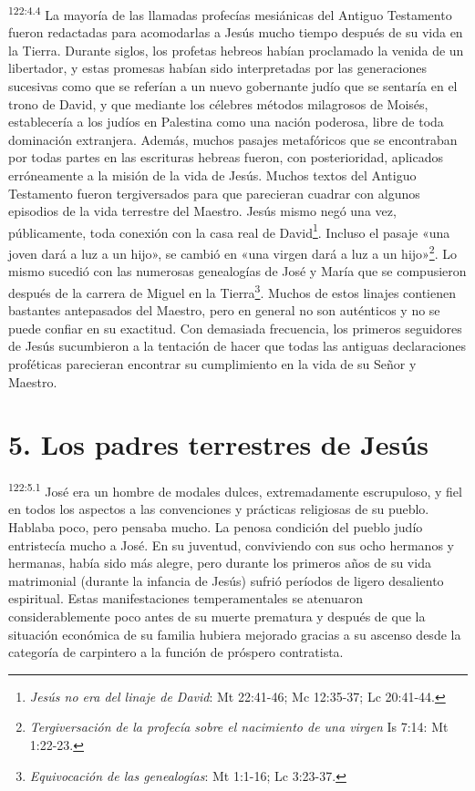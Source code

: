 \par
\textsuperscript{122:4.4} La mayoría de las llamadas profecías mesiánicas del Antiguo Testamento fueron redactadas para acomodarlas a Jesús mucho tiempo después de su vida en la Tierra. Durante siglos, los profetas hebreos habían proclamado la venida de un libertador, y estas promesas habían sido interpretadas por las generaciones sucesivas como que se referían a un nuevo gobernante judío que se sentaría en el trono de David, y que mediante los célebres métodos milagrosos de Moisés, establecería a los judíos en Palestina como una nación poderosa, libre de toda dominación extranjera. Además, muchos pasajes metafóricos que se encontraban por todas partes en las escrituras hebreas fueron, con posterioridad, aplicados erróneamente a la misión de la vida de Jesús. Muchos textos del Antiguo Testamento fueron tergiversados para que parecieran cuadrar con algunos episodios de la vida terrestre del Maestro. Jesús mismo negó una vez, públicamente, toda conexión con la casa real de David\footnote{\textit{Jesús no era del linaje de David}: Mt 22:41-46; Mc 12:35-37; Lc 20:41-44.}. Incluso el pasaje «una joven dará a luz a un hijo», se cambió en «una virgen dará a luz a un hijo»\footnote{\textit{Tergiversación de la profecía sobre el nacimiento de una virgen} Is 7:14: Mt 1:22-23.}. Lo mismo sucedió con las numerosas genealogías de José y María que se compusieron después de la carrera de Miguel en la Tierra\footnote{\textit{Equivocación de las genealogías}: Mt 1:1-16; Lc 3:23-37.}. Muchos de estos linajes contienen bastantes antepasados del Maestro, pero en general no son auténticos y no se puede confiar en su exactitud. Con demasiada frecuencia, los primeros seguidores de Jesús sucumbieron a la tentación de hacer que todas las antiguas declaraciones proféticas parecieran encontrar su cumplimiento en la vida de su Señor y Maestro.

\section*{5. Los padres terrestres de Jesús}
\par
\textsuperscript{122:5.1} José era un hombre de modales dulces, extremadamente escrupuloso, y fiel en todos los aspectos a las convenciones y prácticas religiosas de su pueblo. Hablaba poco, pero pensaba mucho. La penosa condición del pueblo judío entristecía mucho a José. En su juventud, conviviendo con sus ocho hermanos y hermanas, había sido más alegre, pero durante los primeros años de su vida matrimonial (durante la infancia de Jesús) sufrió períodos de ligero desaliento espiritual. Estas manifestaciones temperamentales se atenuaron considerablemente poco antes de su muerte prematura y después de que la situación económica de su familia hubiera mejorado gracias a su ascenso desde la categoría de carpintero a la función de próspero contratista.

